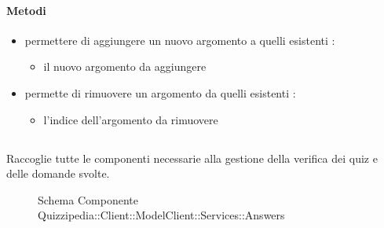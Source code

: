 \paragraph{Metodi}
\begin{itemize}
\item {}
\newline
permettere di aggiungere un nuovo argomento a quelli esistenti
\newline
{} :
\begin{itemize}
\item {}
\newline
il nuovo argomento da aggiungere
\end{itemize}
\item {}
\newline
permette di rimuovere un argomento da quelli esistenti
\newline
{} :
\begin{itemize}
\item {}
\newline
l'indice dell'argomento da rimuovere
\end{itemize}
\end{itemize}
\subsection{}
Raccoglie tutte le componenti necessarie alla gestione della verifica dei quiz e delle domande svolte.
\begin{figure}[H]
\centering
\noindent{}
\caption[Schema Componente Quizzipedia::Client::ModelClient::Services::Answers]{Schema Componente Quizzipedia::Client::ModelClient::Services::Answers}
\end{figure}
